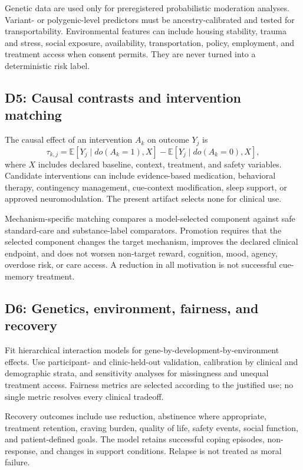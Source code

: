 \documentclass[conference]{IEEEtran}
\begin{document}
Genetic data are used only for preregistered probabilistic moderation analyses. Variant- or polygenic-level predictors must be ancestry-calibrated and tested for transportability. Environmental features can include housing stability, trauma and stress, social exposure, availability, transportation, policy, employment, and treatment access when consent permits. They are never turned into a deterministic risk label.

\subsection{D5: Causal contrasts and intervention matching}
The causal effect of an intervention $A_k$ on outcome $Y_j$ is
\begin{equation}
\tau_{k,j}=\mathbb{E}[Y_j\mid do(A_k=1),X]-\mathbb{E}[Y_j\mid do(A_k=0),X],
\label{eq:causal_effect}
\end{equation}
where $X$ includes declared baseline, context, treatment, and safety variables. Candidate interventions can include evidence-based medication, behavioral therapy, contingency management, cue-context modification, sleep support, or approved neuromodulation. The present artifact selects none for clinical use.

Mechanism-specific matching compares a model-selected component against safe standard-care and substance-label comparators. Promotion requires that the selected component changes the target mechanism, improves the declared clinical endpoint, and does not worsen non-target reward, cognition, mood, agency, overdose risk, or care access. A reduction in all motivation is not successful cue-memory treatment.

\subsection{D6: Genetics, environment, fairness, and recovery}
Fit hierarchical interaction models for gene-by-development-by-environment effects. Use participant- and clinic-held-out validation, calibration by clinical and demographic strata, and sensitivity analyses for missingness and unequal treatment access. Fairness metrics are selected according to the justified use; no single metric resolves every clinical tradeoff.

Recovery outcomes include use reduction, abstinence where appropriate, treatment retention, craving burden, quality of life, safety events, social function, and patient-defined goals. The model retains successful coping episodes, non-response, and changes in support conditions. Relapse is not treated as moral failure.
\end{document}
